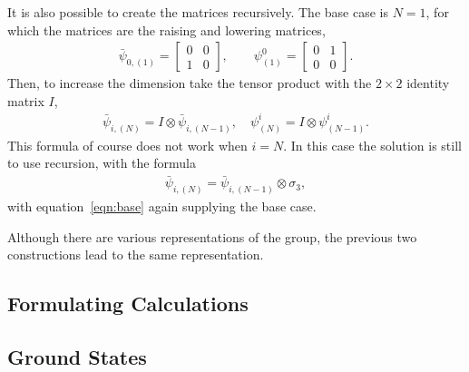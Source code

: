 \documentclass[12pt]{article} %
\begin{document}
It is also possible to create the matrices recursively. The base case is $N=1$, for which the matrices are the raising and lowering matrices,
\begin{align}
\bar\psi_{0,(1)} = \begin{bmatrix} 0&0\\1&0 \end{bmatrix}, \qquad
    \psi^0_{(1)} = \begin{bmatrix} 0&1\\0&0 \end{bmatrix}. \label{eqn:base}
\end{align}
Then, to increase the dimension take the tensor product with the $2\times 2$ identity matrix $I$,
\begin{align}
\bar\psi_{i,(N)} = I\otimes\bar\psi_{i,(N-1)},\quad \psi^i_{(N)} = I\otimes 
	\psi^i_{(N-1)}.
\end{align}
This formula of course does not work when $i=N$. In this case the solution is still to use recursion, with the formula
\begin{align}
\bar\psi_{i,(N)} = \bar\psi_{i,(N-1)}\otimes\sigma_3,
\end{align}
with equation~\ref{eqn:base} again supplying the base case.

Although there are various representations of the group, the previous two constructions lead to the same representation. 

\subsection{Formulating Calculations}

\subsection{Ground States}

\printbibliography
\end{document}
